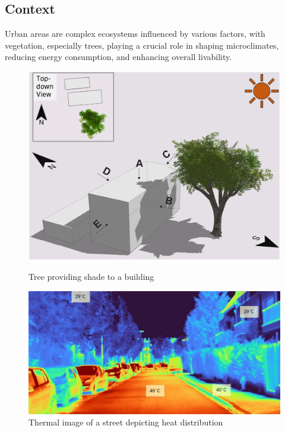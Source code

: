 \documentclass[12pt]{article}
\begin{document}
\subsection{Context}

Urban areas are complex ecosystems influenced by various factors, with
vegetation, especially trees, playing a crucial role in shaping microclimates,
reducing energy consumption, and enhancing overall livability\cite{TIR4sTREEt}.

\begin{figure}[H]
    \begin{minipage}{0.45\textwidth}
        \centering
        \includegraphics[width=1\textwidth]{images/TreeShade.png}
        \caption{Tree providing shade to a building \cite{img:TreeShade}}
    \end{minipage}
    \begin{minipage}{0.45\textwidth}
        \centering
        \includegraphics[width=1\textwidth]{images/heat_street.png}
        \caption{Thermal image of a street depicting heat distribution \cite{img:street_thermography}}
    \end{minipage}
\end{figure}
\end{document}
